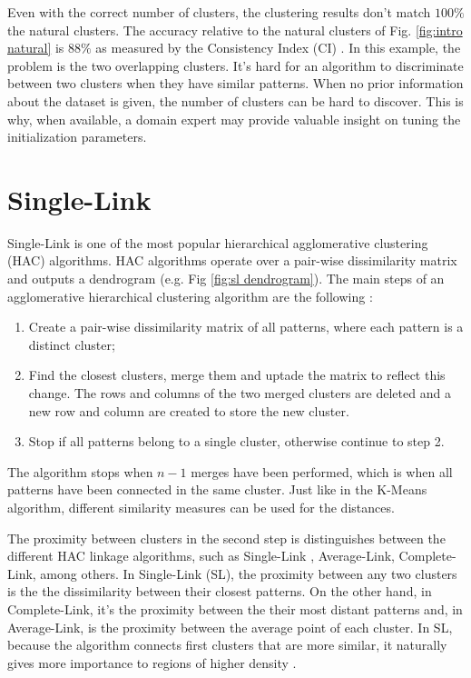 Even with the correct number of clusters, the clustering results don't match $100\%$ the natural clusters.
The accuracy relative to the natural clusters of Fig. \ref{fig:intro natural} is $88\%$ as measured by the Consistency Index (CI) \cite{Fred2001}.
In this example, the problem is the two overlapping clusters.
It's hard for an algorithm to discriminate between two clusters when they have similar patterns.
When no prior information about the dataset is given, the number of clusters can be hard to discover.
This is why, when available, a domain expert may provide valuable insight on tuning the initialization parameters.

\section{Single-Link}
\label{sec:sl}

Single-Link \cite{sneath1962numerical} is one of the most popular hierarchical agglomerative clustering (HAC) algorithms.
HAC algorithms operate over a pair-wise dissimilarity matrix and outputs a dendrogram (e.g. Fig \ref{fig:sl dendrogram}).
The main steps of an agglomerative hierarchical clustering algorithm are the following \cite{Jain1999}:
\begin{enumerate}
    \item Create a pair-wise dissimilarity matrix of all patterns, where each  pattern is a distinct cluster;

    \item Find the closest clusters, merge them and uptade the matrix to reflect this change. The rows and columns of the two merged clusters are deleted and a new row and column are created to store the new cluster.%

    \item Stop if all patterns belong to a single cluster, otherwise continue to step 2.
\end{enumerate}

The algorithm stops when $n-1$ merges have been performed, which is when all patterns have been connected in the same cluster.
Just like in the K-Means algorithm, different similarity measures can be used for the distances.

The proximity between clusters in the second step is distinguishes between the different HAC linkage algorithms, such as Single-Link , Average-Link, Complete-Link, among others.
In Single-Link (SL), the proximity between any two clusters is the the dissimilarity between their closest patterns.
On the other hand, in Complete-Link, it's the proximity between the their most distant patterns and, in Average-Link, is the proximity between the average point of each cluster.
In SL, because the algorithm connects first clusters that are more similar, it naturally gives more importance to regions of higher density \cite{Aggarwal2014}.

